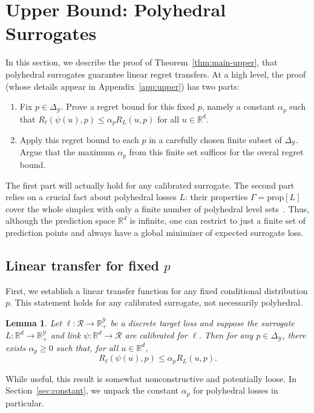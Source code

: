\documentclass{article}
\newtheorem{lemma}{Lemma}
\theoremstyle{definition}\newtheorem{definition}{Definition}
\theoremstyle{definition}\newtheorem{assumption}{Assumption}
\newcommand{\reals}{\mathbb{R}}
\newcommand{\prop}[1]{\mathrm{prop}[#1]}
\newcommand{\simplex}{\Delta_\Y}
\newcommand{\R}{\mathcal{R}}
\newcommand{\Y}{\mathcal{Y}}
\begin{document}


\section{Upper Bound: Polyhedral Surrogates} \label{sec:upper}
In this section, we describe the proof of Theorem~\ref{thm:main-upper}, that polyhedral surrogates guarantee linear regret transfers.
At a high level, the proof (whose details appear in Appendix~\ref{app:upper}) has two parts:
\begin{enumerate}
\item Fix $p\in\simplex$.
  Prove a regret bound for this fixed $p$, namely a constant $\alpha_p$ such that $R_{\ell}(\psi(u),p) \leq \alpha_p R_L(u,p)$ for all $u\in\reals^d$.
      \item Apply this regret bound to each $p$ in a carefully chosen finite subset of $\simplex$.
        Argue that the maximum $\alpha_p$ from this finite set suffices for the overal regret bound.
\end{enumerate}
The first part will actually hold for any calibrated surrogate.
The second part relies on a crucial fact about polyhedral losses $L$: their properties $\Gamma=\prop{L}$ cover the whole simplex with only a finite number of polyhedral level sets~\cite{finocchiaro2019embedding}.
Thus, although the prediction space $\reals^d$ is infinite, one can restrict to just a finite set of prediction points and always have a global minimizer of expected surrogate loss.

\subsection{Linear transfer for fixed $p$}
First, we establish a linear transfer function for any fixed conditional distribution $p$.
This statement holds for any calibrated surrogate, not necessarily polyhedral.
\begin{lemma} \label{lemma:fixed-p}
  Let $\ell: \R \to \reals_+^{\Y}$ be a discrete target loss and suppose the surrogate $L: \reals^d \to \reals_+^{\Y}$ and link $\psi: \reals^d \to \R$ are calibrated for $\ell$.
  Then for any $p \in \simplex$, there exists $\alpha_p \geq 0$ such that, for all $u \in \reals^d$,
    \[ R_{\ell}(\psi(u),p) \leq \alpha_p R_L(u,p) . \]
\end{lemma}
While useful, this result is somewhat nonconstructive and potentially loose.
In Section~\ref{sec:constant}, we unpack the constant $\alpha_p$ for polyhedral losses in particular.
\end{document}
